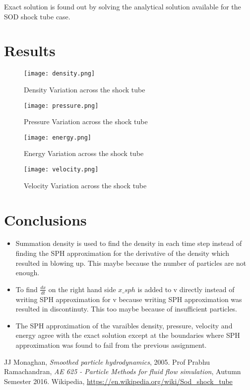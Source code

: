 \documentclass[12pt, a4paper]{report}
\begin{document}
Exact solution is found out by solving the analytical solution available for the SOD shock tube case. \cite{exact_solution}


\newpage

\section*{Results}
\begin{figure}[H]
	\texttt{[image: density.png]}
	\caption{Density Variation across the shock tube}
\end{figure}
\begin{figure}[H]
	\texttt{[image: pressure.png]}
	\caption{Pressure Variation across the shock tube}
\end{figure}
\begin{figure}[H]
	\texttt{[image: energy.png]}
	\caption{Energy Variation across the shock tube}
\end{figure}
\begin{figure}[H]
	\texttt{[image: velocity.png]}
	\caption{Velocity Variation across the shock tube}
\end{figure}

\section*{Conclusions}
\begin{itemize}
	\item Summation density is used to find the density in each time step instead of finding the SPH approximation for the derivative of the density which resulted in blowing up. This maybe because the number of particles are not enough. 
	\item To find $\frac{dx}{dt}$ on the right hand side $x\_sph$ is added to v directly instead of writing SPH approximation for v because writing SPH approximation was resulted in discontinuty. This too maybe because of insufficient particles.  
	\item The SPH approximation of the varaibles density, pressure, velocity and energy agree with the exact solution except at the boundaries where SPH approximation was found to fail from the previous assignment. 
\end{itemize}

\begin{thebibliography}{1}
	JJ Monaghan, {\em Smoothed particle hydrodynamics}, 2005.
	Prof Prabhu Ramachandran, {\em AE 625 - Particle Methods for fluid flow simulation}, Autumn Semester 2016.
	Wikipedia, \url{https://en.wikipedia.org/wiki/Sod_shock_tube}
\end{thebibliography}
\end{document}
